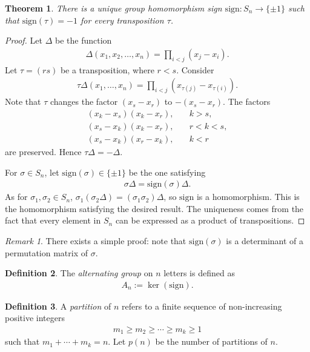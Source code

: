 \documentclass[12pt]{report}
\theoremstyle{plain}
\newtheorem{theorem}{Theorem}[section]
\theoremstyle{remark}
\newtheorem*{remark}{Remark}
\theoremstyle{definition}
\newtheorem{definition}[theorem]{Definition}
\begin{document}
\begin{theorem}
    There is a unique group homomorphism sign $\mathrm{sign}:S_n\rightarrow\{\pm1\}$ such that $\mathrm{sign}(\tau)=-1$ for every transposition $\tau$.
\end{theorem}
\begin{proof}
    Let $\Delta$ be the function
    \begin{align*}
        \Delta(x_1,x_2,\dots, x_n)=\prod_{i<j}(x_j-x_i).
    \end{align*}
    Let $\tau=(rs)$ be a transposition, where $r<s$. Consider
    \begin{align*}
        \tau\Delta(x_1,\dots,x_n)=\prod_{i<j}(x_{\tau(j)}-x_{\tau(i)}).
    \end{align*}
    Note that $\tau$ changes the factor $(x_s-x_r)$ to $-(x_s-x_r)$. The factors
    \begin{align*}
        (x_k-x_s)(x_k-x_r),&\quad k>s, \\
        (x_s-x_k)(x_k-x_r),&\quad r<k<s, \\
        (x_s-x_k)(x_r-x_k),&\quad k<r
    \end{align*}
    are preserved. Hence $\tau\Delta = -\Delta$. 

    For $\sigma\in S_n$, let $\mathrm{sign}(\sigma)\in\{\pm 1\}$ be the one satisfying
    \begin{align*}
        \sigma\Delta = \mathrm{sign}(\sigma)\Delta.
    \end{align*}
    As for $\sigma_1,\sigma_2\in S_n$, $\sigma_1(\sigma_2\Delta)=(\sigma_1\sigma_2)\Delta$, so $\mathrm{sign}$ is a homomorphism. This is the homomorphism satisfying the desired result. The uniqueness comes from the fact that every element in $S_n$ can be expressed as a product of transpositions.
\end{proof}
\begin{remark}
    There exists a simple proof: note that $\mathrm{sign}(\sigma)$ is a determinant of a permutation matrix of $\sigma$.
\end{remark}

\begin{definition}
    The \emph{alternating group} on $n$ letters is defined as
    \begin{align*}
        A_n := \ker (\mathrm{sign}).
    \end{align*}
\end{definition}

\begin{definition}
    A \emph{partition} of $n$ refers to a finite sequence of non-increasing positive integers
    \begin{align*}
        m_1 \ge m_2 \ge \cdots \ge m_k \ge 1
    \end{align*}
    such that $m_1+\cdots+m_k = n$. Let $p(n)$ be the number of partitions of $n$.
\end{definition}
\end{document}
